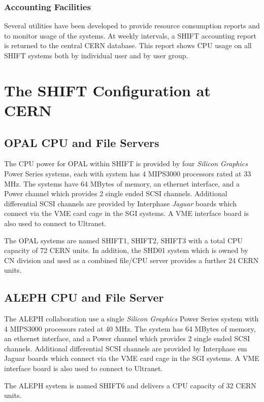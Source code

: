 \subsection {Accounting Facilities}
 
Several utilities have been developed to provide resource consumption
reports and to monitor usage of the systems.
At weekly intervals, a SHIFT accounting report is returned to the
central CERN database. This report shows CPU usage on all SHIFT systems both by
individual user and by user group.
 
 
\chapter{The SHIFT Configuration at CERN}
 
 
\section {OPAL CPU and File Servers}
 
The CPU power for OPAL within SHIFT is provided by four
{\em Silicon Graphics}
Power Series systems, each with system has 4 MIPS3000
processors rated at 33 MHz.
The systems have 64 MBytes of memory, an ethernet interface,
and a Power channel which provides 2 single ended SCSI channels.
Additional differential SCSI channels are provided by Interphase
{\em Jaguar} boards which connect via the VME card cage in the
SGI systems.
A VME interface board is also used to connect to Ultranet.
 
The OPAL systems are named SHIFT1, SHIFT2, SHIFT3 with a total
CPU capacity of 72 CERN units. In addition, the SHD01 system
which is owned by CN division and used as a combined file/CPU server
provides a further 24 CERN units.
 
\section {ALEPH CPU and File Server}
 
The ALEPH collaboration use a single
{\em Silicon Graphics}
Power Series system with 4 MIPS3000
processors rated at 40 MHz.
The system has 64 MBytes of memory, an ethernet interface,
and a Power channel which provides 2 single ended SCSI channels.
Additional differential SCSI channels are provided by Interphase
{em Jaguar} boards which connect via the VME card cage in the
SGI systems.
A VME interface board is also used to connect to Ultranet.
 
The ALEPH system is named SHIFT6
and delivers a CPU capacity of 32 CERN units.
 
